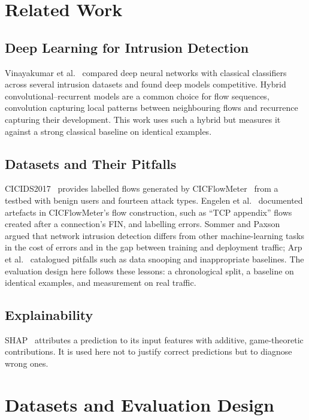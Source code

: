\documentclass[conference]{IEEEtran}
\begin{document}
\section{Related Work}

\subsection{Deep Learning for Intrusion Detection}
Vinayakumar et al.~\cite{ref3} compared deep neural networks with classical
classifiers across several intrusion datasets and found deep models
competitive. Hybrid convolutional--recurrent models are a common choice for
flow sequences, convolution capturing local patterns between neighbouring
flows and recurrence capturing their development. This work uses such a
hybrid but measures it against a strong classical baseline on identical
examples.

\subsection{Datasets and Their Pitfalls}
CICIDS2017~\cite{ref1} provides labelled flows generated by
CICFlowMeter~\cite{ref2} from a testbed with benign users and fourteen attack
types. Engelen et al.~\cite{ref4} documented artefacts in CICFlowMeter's flow
construction, such as ``TCP appendix'' flows created after a connection's
FIN, and labelling errors. Sommer and Paxson~\cite{ref6} argued that network
intrusion detection differs from other machine-learning tasks in the cost of
errors and in the gap between training and deployment traffic; Arp et
al.~\cite{ref7} catalogued pitfalls such as data snooping and inappropriate
baselines. The evaluation design here follows these lessons: a chronological
split, a baseline on identical examples, and measurement on real traffic.

\subsection{Explainability}
SHAP~\cite{ref5} attributes a prediction to its input features with additive,
game-theoretic contributions. It is used here not to justify correct
predictions but to diagnose wrong ones.

\section{Datasets and Evaluation Design}
\end{document}
